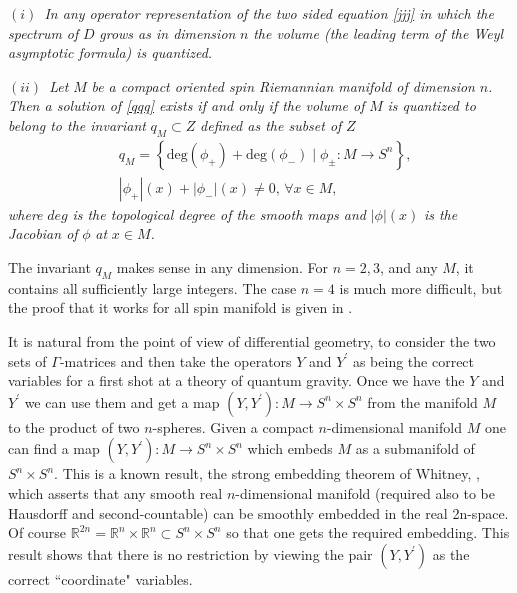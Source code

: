\documentclass
[twocolumn,prl,unsortedaddress,superscriptaddress,showpacs]{revtex4}%
\begin{document}
$(i)$\emph{~In any operator representation of the two sided equation
\eqref{jjj} in which the spectrum of }$D$\emph{ grows as in dimension }%
$n$\emph{ the volume (the leading term of the Weyl asymptotic formula) is
quantized.}

$(ii)$\emph{~Let }$M$\emph{ be a compact oriented spin Riemannian manifold of
dimension }$n$\emph{. Then a solution of \eqref{qqq} exists if and only if the
volume of }$M$\emph{ is quantized to belong to the invariant }$q_{M}\subset
Z$\emph{ defined as the subset of }$Z$\emph{ }%
\begin{align}
&  q_{M}=\left\{  \mathrm{deg}(\phi_{+})+\mathrm{deg}(\phi_{-})\mid\phi_{\pm
}:M\rightarrow S^{n}\right\}  ,\nonumber\\
&  |\phi_{+}|(x)+|\phi_{-}|(x)\neq0,\,\forall x\in M,
\end{align}
\emph{where }$deg$\emph{ is the topological degree of the smooth maps and
}$|\phi|(x)$\emph{ is the Jacobian of }$\phi$\emph{ at }$x\in M$\emph{.}

The invariant $q_{M}$ makes sense in any dimension. For $n=2,3$, and any $M$,
it contains all sufficiently large integers. The case $n=4$ is much more
difficult, but the proof that it works for all spin manifold is given in
\cite{CCM1}.

It is natural from the point of view of differential geometry, to consider the
two sets of $\Gamma$-matrices and then take the operators $Y$ and $Y^{\prime}$
as being the correct variables for a first shot at a theory of quantum
gravity. Once we have the $Y$ and $Y^{\prime}$ we can use them and get a map
$(Y,Y^{\prime}):M\rightarrow S^{n}\times S^{n}$ from the manifold $M$ to the
product of two $n$-spheres. Given a compact $n$-dimensional manifold $M$ one
can find a map $(Y,Y^{\prime}):M\rightarrow S^{n}\times S^{n}$ which embeds
$M$ as a submanifold of $S^{n}\times S^{n}$. This is a known result, the
strong embedding theorem of Whitney, \cite{WW}, which asserts that any smooth
real $n$-dimensional manifold (required also to be Hausdorff and
second-countable) can be smoothly embedded in the real 2n-space. Of course
${\mathbb{R}}^{2n}={\mathbb{R}}^{n}\times{\mathbb{R}}^{n}\subset S^{n}\times
S^{n}$ so that one gets the required embedding. This result shows that there
is no restriction by viewing the pair $(Y,Y^{\prime})$ as the correct
\textquotedblleft coordinate" variables.
\end{document}
